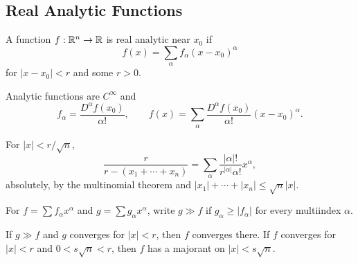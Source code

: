 \subsection{Real Analytic Functions}
\label{sec:real-analytic-functions}

\begin{definition}
\label{def:real-analytic-function}
A function $f:\mathbb{R}^n\to\mathbb{R}$ is real analytic near $x_0$ if
\[
f(x)=\sum_\alpha f_\alpha(x-x_0)^\alpha
\]
for $|x-x_0|<r$ and some $r>0$.
\end{definition}

\begin{remark}
\label{rem:real-analytic-function-remarks}

Analytic functions are $C^\infty$ and
\[
f_\alpha=\frac{D^\alpha f(x_0)}{\alpha!},\qquad
f(x)=\sum_\alpha\frac{D^\alpha f(x_0)}{\alpha!}(x-x_0)^\alpha.
\]
\end{remark}

\begin{example}
\label{ex:real-analytic-example-rational-function}

For $|x|<r/\sqrt n$,
\[
\frac r{r-(x_1+\cdots+x_n)}
=\sum_\alpha\frac{|\alpha|!}{r^{|\alpha|}\alpha!}x^\alpha,
\]
absolutely, by the multinomial theorem and
$|x_1|+\cdots+|x_n|\le\sqrt n|x|$.
\end{example}

\begin{definition}[Majorizes]
\label{def:power-series-majorizes}
For $f=\sum f_\alpha x^\alpha$ and $g=\sum g_\alpha x^\alpha$, write
$g\gg f$ if $g_\alpha\ge|f_\alpha|$ for every multiindex $\alpha$.
\end{definition}

\begin{lemma}[Majorants]
\label{lem:power-series-majorants}

If $g\gg f$ and $g$ converges for $|x|<r$, then $f$ converges there. If $f$
converges for $|x|<r$ and $0<s\sqrt n<r$, then $f$ has a majorant on
$|x|<s\sqrt n$.
\end{lemma}

